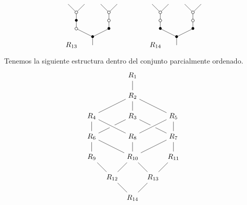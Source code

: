 \documentclass[../main.tex]{subfiles}
\begin{document}
\begin{ex}
    $$
        \xy
        <0.08cm, 0cm>:
        (0.0, 0.0)*{}="1"; %
        (0.0, 5.0)*=0{\bullet}="2"; %
        (-10.0, 10.0)*\cir<2pt>{}="3"; %
        (-10.0, 15.0)*=0{\bullet}="4"; %
        (-10.0, 20.0)*\cir<2pt>{}="5"; %
        (-15.0, 25.0)*{}="6"; %
        (-5.0, 25.0)*{}="7"; %
        (10.0, 10.0)*=0{\bullet}="8"; %
        (10.0, 15.0)*\cir<2pt>{}="9"; %
        (10.0, 20.0)*\cir<2pt>{}="10"; %
        (5.0, 25.0)*{}="11"; %
        (15.0, 25.0)*{}="12"; %
        "1";"2" **\dir{-};
        "2";"3" **\dir{-};
        "3";"4" **\dir{-};
        "4";"5" **\dir{-};
        "5";"6" **\dir{-};
        "5";"7" **\dir{-};
        "2";"8" **\dir{-};
        "8";"9" **\dir{-};
        "9";"10" **\dir{-};
        "10";"11" **\dir{-};
        "10";"12" **\dir{-};
        (-13,0)*{R_{13}};
        \endxy
        \xy
        <0.08cm, 0cm>:
        (-10, 0.0)*{}="1";
        (10, 10.0)*{}="2";
        \endxy
        \xy
        <0.08cm, 0cm>:
        (0.0, 0.0)*{}="1"; %
        (0.0, 5.0)*=0{\bullet}="2"; %
        (-10.0, 10.0)*=0{\bullet}="3"; %
        (-10.0, 15.0)*\cir<2pt>{}="4"; %
        (-10.0, 20.0)*\cir<2pt>{}="5"; %
        (-15.0, 25.0)*{}="6"; %
        (-5.0, 25.0)*{}="7"; %
        (10.0, 10.0)*=0{\bullet}="8"; %
        (10.0, 15.0)*\cir<2pt>{}="9"; %
        (10.0, 20.0)*\cir<2pt>{}="10"; %
        (5.0, 25.0)*{}="11"; %
        (15.0, 25.0)*{}="12"; %
        "1";"2" **\dir{-};
        "2";"3" **\dir{-};
        "3";"4" **\dir{-};
        "4";"5" **\dir{-};
        "5";"6" **\dir{-};
        "5";"7" **\dir{-};
        "2";"8" **\dir{-};
        "8";"9" **\dir{-};
        "9";"10" **\dir{-};
        "10";"11" **\dir{-};
        "10";"12" **\dir{-};
        (-13,0)*{R_{14}};
        \endxy
    $$

    Tenemos la siguiente estructura dentro del conjunto parcialmente ordenado.
    $$
        \begin{tikzpicture}
            \node (max) at (0,0) {$R_{14}$};
            \node (12) at (-1,1) {$R_{12}$};
            \node (13) at (1,1) {$R_{13}$};
            \node (9) at (-2,2) {$R_{9}$};
            \node (10) at (0,2) {$R_{10}$};
            \node (11) at (2,2) {$R_{11}$};
            \node (6) at (-2,3) {$R_{6}$};
            \node (8) at (0,3) {$R_{8}$};
            \node (7) at (2,3) {$R_{7}$};
            \node (4) at (-2,4) {$R_{4}$};
            \node (3) at (0,4) {$R_{3}$};
            \node (5) at (2,4) {$R_{5}$};
            \node (2) at (0,5) {$R_{2}$};
            \node (min) at (0,6) {$R_{1}$};
            \draw (min) -- (2) -- (4) -- (6) -- (9) -- (12) -- (max)
            (2) -- (5) -- (7) -- (11) -- (13) -- (max)
            (2) -- (3) -- (6) -- (10) -- (12)
            (3) -- (7) -- (10) -- (13)
            (8) -- (10);
            \draw[preaction={draw=white, -,line width=6pt}] (4) -- (8) -- (5);
        \end{tikzpicture}
    $$
\end{ex}
\end{document}

